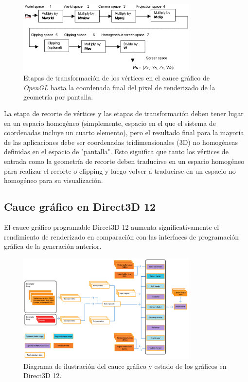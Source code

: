 \documentclass[a4paper]{book}
\begin{document}
\begin{figure}[H]
    \centering
    \includegraphics[width=9cm, keepaspectratio]{img/d3dxfrm61.png}
    \caption{Etapas de transformación de los vértices en el cauce gráfico de \textit{OpenGL} hasta la coordenada final
    del pixel de renderizado de la geometría por pantalla.}
    \label{d3dxfrm61}
\end{figure}

La etapa de recorte de vértices y las etapas de transformación deben tener lugar en un espacio homogéneo (simplemente,
espacio en el que el sistema de coordenadas incluye un cuarto elemento), pero el resultado final para la mayoría de
las aplicaciones debe ser coordenadas tridimensionales (3D) no homogéneas definidas en el espacio de "pantalla".
Esto significa que tanto los vértices de entrada como la geometría de recorte deben traducirse en un espacio homogéneo
para realizar el recorte o clipping y luego volver a traducirse en un espacio no homogéneo para su visualización.

\subsection{Cauce gráfico en Direct3D 12}
\label{subsec:CauceDX12}

El cauce gráfico programable Direct3D 12 aumenta significativamente el rendimiento de renderizado en comparación
con las interfaces de programación gráfica de la generación anterior.

\begin{figure}[H]
    \centering
    \includegraphics[width=9cm, keepaspectratio]{img/pipelined123d.png}
    \caption{Diagrama de ilustración del cauce gráfico y estado de los gráficos en Direct3D 12.}
    \label{pipelined123d}
\end{figure}
\end{document}
